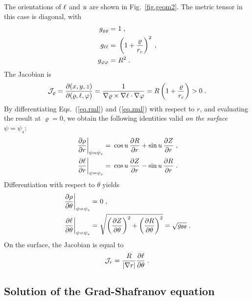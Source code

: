 %
\noindent
The orientations of $\ell$ and $u$ are shown in 
Fig.~\ref{fig.geom2}.  The metric tensor in this 
case is diagonal, with
%
\begin{align}
g_{\varrho\varrho} = &~1 \; , \\
g_{\ell\ell} = &~\left( 1+\frac{\varrho}{r_c} \right)^2 \; , \\
g_{\varphi\varphi} = &~R^2 \; .
\end{align}
%
The Jacobian is
%
\begin{equation}
{\cal J}_\varrho = \frac{\partial(x,y,z)}{\partial(\varrho,\ell,\varphi)} 
= \frac{1}{\nabla\varrho \times \nabla\ell \cdot\nabla\varphi}
= R \left(1+\frac{\varrho}{r_c} \right) > 0 \; .
\end{equation}
%
By differentiating Eqs.~(\ref{eq.rml}) and (\ref{eq.zml}) 
with respect to $r$, and evaluating the result at $\varrho=0$,
we obtain the following identities valid {\it on the surface} 
$\psi = \psi_s$:
%
\begin{align}
\left. \frac{\partial\rho}{\partial r}\right|_{\psi=\psi_s}  
 = &~\cos u \, \frac{\partial R}{\partial r} 
 +\sin u \, \frac{\partial Z}{\partial r} \; , \\
\left. \frac{\partial\ell}{\partial r}\right|_{\psi=\psi_s} 
 = &~\cos u \, \frac{\partial Z}{\partial r}
 -\sin u \, \frac{\partial R}{\partial r} \; .
\end{align}
%
Differentiation with respect to $\theta$ yields
%
\begin{align}
\left. \frac{\partial\rho}{\partial\theta}\right|_{\psi=\psi_s}  
 = &~0 \; , \\
\left. \frac{\partial\ell}{\partial\theta}\right|_{\psi=\psi_s} 
 = &~\sqrt{ \left(\frac{\partial Z}{\partial\theta}\right)^2
+ \left(\frac{\partial R}{\partial\theta}\right)^2} = \sqrt{g_{\theta\theta}} \; .
\end{align}
%
On the surface, the Jacobian is equal to
%
\begin{equation}
{\mathcal J}_r = \frac{R}{|\nabla r|} \frac{\partial\ell}{\partial\theta} \; .
\end{equation}


\subsection{Solution of the Grad-Shafranov equation}

